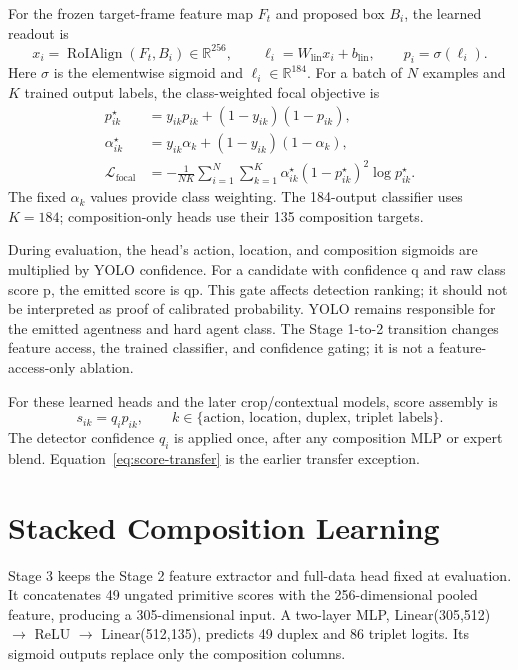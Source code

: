 For the frozen target-frame feature map \(F_t\) and proposed box \(B_i\), the learned readout is
\begin{equation}\label{eq:roi-head}
 x_i=\operatorname{RoIAlign}(F_t,B_i)\in\mathbb R^{256},\qquad
 \ell_i=W_{\mathrm{lin}}x_i+b_{\mathrm{lin}},\qquad p_i=\sigma(\ell_i).
\end{equation}
Here \(\sigma\) is the elementwise sigmoid and \(\ell_i\in\mathbb R^{184}\). For a batch of \(N\) examples and \(K\) trained output labels, the class-weighted focal objective is
\begin{align}
 p^{\star}_{ik}&=y_{ik}p_{ik}+(1-y_{ik})(1-p_{ik}),\nonumber\\
 \alpha^{\star}_{ik}&=y_{ik}\alpha_k+(1-y_{ik})(1-\alpha_k),\nonumber\\
 \mathcal L_{\mathrm{focal}}&=-\frac{1}{NK}\sum_{i=1}^{N}\sum_{k=1}^{K}
 \alpha^{\star}_{ik}(1-p^{\star}_{ik})^{2}\log p^{\star}_{ik}.
 \label{eq:focal}
\end{align}
The fixed \(\alpha_k\) values provide class weighting. The 184-output classifier uses \(K=184\); composition-only heads use their 135 composition targets.

During evaluation, the head’s action, location, and composition sigmoids are multiplied by YOLO confidence. For a candidate with confidence q and raw class score p, the emitted score is qp. This gate affects detection ranking; it should not be interpreted as proof of calibrated probability. YOLO remains responsible for the emitted agentness and hard agent class. The Stage 1-to-2 transition changes feature access, the trained classifier, and confidence gating; it is not a feature-access-only ablation.

For these learned heads and the later crop/contextual models, score assembly is
\begin{equation}\label{eq:score-assembly}
 s_{ik}=q_i p_{ik},\qquad k\in\{\text{action, location, duplex, triplet labels}\}.
\end{equation}
The detector confidence \(q_i\) is applied once, after any composition MLP or expert blend. Equation~\ref{eq:score-transfer} is the earlier transfer exception.

\section{Stacked Composition Learning}

Stage 3 keeps the Stage 2 feature extractor and full-data head fixed at evaluation. It concatenates 49 ungated primitive scores with the 256-dimensional pooled feature, producing a 305-dimensional input. A two-layer MLP, Linear(305,512) \(\rightarrow\) ReLU \(\rightarrow\) Linear(512,135), predicts 49 duplex and 86 triplet logits. Its sigmoid outputs replace only the composition columns.

